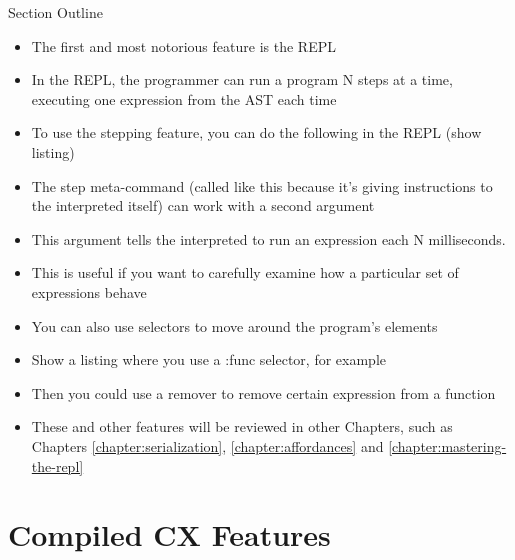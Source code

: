\documentclass[11pt,fleqn,openany]{book} %
\begin{document}
\begin{remark}
Section Outline
    \begin{itemize}
    \item The first and most notorious feature is the REPL
    \item In the REPL, the programmer can run a program N steps at a time, executing one expression from the AST each time
    \item To use the stepping feature, you can do the following in the REPL (show listing)
    \item The step meta-command (called like this because it's giving instructions to the interpreted itself) can work with a second argument
    \item This argument tells the interpreted to run an expression each N milliseconds.
    \item This is useful if you want to carefully examine how a particular set of expressions behave
    \item You can also use selectors to move around the program's elements
    \item Show a listing where you use a :func selector, for example
    \item Then you could use a remover to remove certain expression from a function
    \item These and other features will be reviewed in other Chapters, such as Chapters \ref{chapter:serialization}, \ref{chapter:affordances} and \ref{chapter:mastering-the-repl}
    \end{itemize}
\end{remark}

\section{Compiled CX Features}
\end{document}
